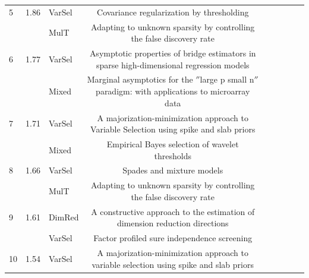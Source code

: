 \documentclass{article}
\begin{document}
\begin{landscape}
\begin{table}[t]
\begin{tabular}{lclclclcl}
5    & 1.86                      & VarSel    & Covariance regularization by thresholding                                                     &                                                             \\
     &                           & MulT      & Adapting to unknown sparsity by controlling the false discovery rate                          &                                                             \\
6    & 1.77                      & VarSel    & Asymptotic properties of bridge estimators in sparse high-dimensional regression models       &                                                             \\
     &                           & Mixed     & Marginal asymptotics for the $''$large p small n$''$ paradigm: with applications to microarray data                                                 &  \\
7    & 1.71                      & VarSel    & A majorization-minimization approach to Variable Selection using spike and slab priors        &                                                             \\
     &                           & Mixed     & Empirical Bayes selection of wavelet thresholds                                           &                                                             \\
8    & 1.66                      & VarSel    & Spades and mixture models                                                                     &                                                             \\
     &                           & MulT      & Adapting to unknown sparsity by controlling the false discovery rate                          &                                                             \\
9    & 1.61                      & DimRed    & A constructive approach to the estimation of dimension reduction directions                   &                                                             \\
     &                           & VarSel    & Factor profiled sure independence screening                                                   &                                                             \\
10   & 1.54                      & VarSel    & A majorization-minimization approach to variable selection using spike and slab priors        &                                                             \\

\end{tabular}
\end{table}
\end{landscape}
\end{document}

